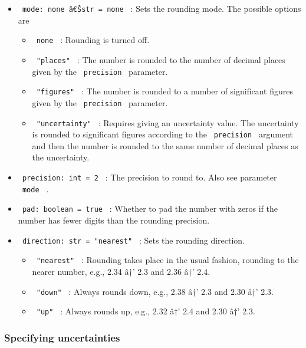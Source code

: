\begin{itemize}
\tightlist
\item
  \texttt{\ mode:\ none\ \textbar{}â€Šstr\ =\ none\ } : Sets the
  rounding mode. The possible options are

  \begin{itemize}
  \tightlist
  \item
    \texttt{\ none\ } : Rounding is turned off.
  \item
    \texttt{\ "places"\ } : The number is rounded to the number of
    decimal places given by the \texttt{\ precision\ } parameter.
  \item
    \texttt{\ "figures"\ } : The number is rounded to a number of
    significant figures given by the \texttt{\ precision\ } parameter.
  \item
    \texttt{\ "uncertainty"\ } : Requires giving an uncertainty value.
    The uncertainty is rounded to significant figures according to the
    \texttt{\ precision\ } argument and then the number is rounded to
    the same number of decimal places as the uncertainty.
  \end{itemize}
\item
  \texttt{\ precision:\ int\ =\ 2\ } : The precision to round to. Also
  see parameter \texttt{\ mode\ } .
\item
  \texttt{\ pad:\ boolean\ =\ true\ } : Whether to pad the number with
  zeros if the number has fewer digits than the rounding precision.
\item
  \texttt{\ direction:\ str\ =\ "nearest"\ } : Sets the rounding
  direction.

  \begin{itemize}
  \tightlist
  \item
    \texttt{\ "nearest"\ } : Rounding takes place in the usual fashion,
    rounding to the nearer number, e.g., 2.34 â†' 2.3 and 2.36 â†' 2.4.
  \item
    \texttt{\ "down"\ } : Always rounds down, e.g., 2.38 â†' 2.3 and
    2.30 â†' 2.3.
  \item
    \texttt{\ "up"\ } : Always rounds up, e.g., 2.32 â†' 2.4 and 2.30
    â†' 2.3.
  \end{itemize}
\end{itemize}

\subsubsection{Specifying uncertainties}\label{specifying-uncertainties}

